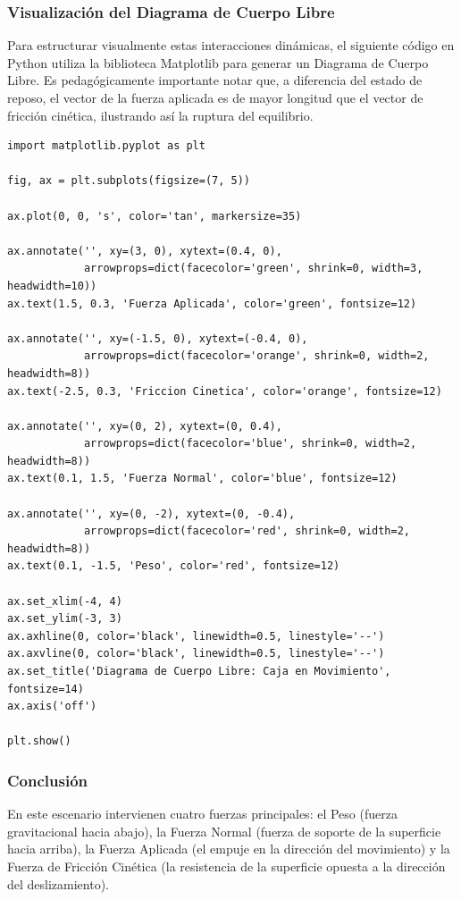 \documentclass[12pt]{article}
\begin{document}
\subsubsection*{Visualización del Diagrama de Cuerpo Libre}
Para estructurar visualmente estas interacciones dinámicas, el siguiente código en Python utiliza la biblioteca Matplotlib para generar un Diagrama de Cuerpo Libre. Es pedagógicamente importante notar que, a diferencia del estado de reposo, el vector de la fuerza aplicada es de mayor longitud que el vector de fricción cinética, ilustrando así la ruptura del equilibrio.

\begin{lstlisting}
import matplotlib.pyplot as plt

fig, ax = plt.subplots(figsize=(7, 5))

ax.plot(0, 0, 's', color='tan', markersize=35)

ax.annotate('', xy=(3, 0), xytext=(0.4, 0),
            arrowprops=dict(facecolor='green', shrink=0, width=3, headwidth=10))
ax.text(1.5, 0.3, 'Fuerza Aplicada', color='green', fontsize=12)

ax.annotate('', xy=(-1.5, 0), xytext=(-0.4, 0),
            arrowprops=dict(facecolor='orange', shrink=0, width=2, headwidth=8))
ax.text(-2.5, 0.3, 'Friccion Cinetica', color='orange', fontsize=12)

ax.annotate('', xy=(0, 2), xytext=(0, 0.4),
            arrowprops=dict(facecolor='blue', shrink=0, width=2, headwidth=8))
ax.text(0.1, 1.5, 'Fuerza Normal', color='blue', fontsize=12)

ax.annotate('', xy=(0, -2), xytext=(0, -0.4),
            arrowprops=dict(facecolor='red', shrink=0, width=2, headwidth=8))
ax.text(0.1, -1.5, 'Peso', color='red', fontsize=12)

ax.set_xlim(-4, 4)
ax.set_ylim(-3, 3)
ax.axhline(0, color='black', linewidth=0.5, linestyle='--')
ax.axvline(0, color='black', linewidth=0.5, linestyle='--')
ax.set_title('Diagrama de Cuerpo Libre: Caja en Movimiento', fontsize=14)
ax.axis('off')

plt.show()
\end{lstlisting}

\subsubsection*{Conclusión}
En este escenario intervienen cuatro fuerzas principales: el Peso (fuerza gravitacional hacia abajo), la Fuerza Normal (fuerza de soporte de la superficie hacia arriba), la Fuerza Aplicada (el empuje en la dirección del movimiento) y la Fuerza de Fricción Cinética (la resistencia de la superficie opuesta a la dirección del deslizamiento).
\end{document}
